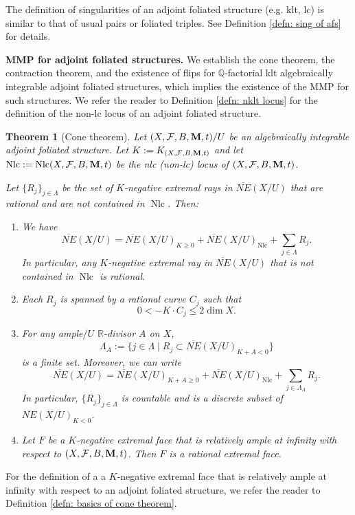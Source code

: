 \documentclass[12pt]{amsart}
\numberwithin{equation}{section}
\newcommand{\Mm}{{\bf{M}}}
\newcommand{\Qq}{\mathbb{Q}}
\newcommand{\Rr}{\mathbb{R}}
\newcommand{\Nlc}{\operatorname{Nlc}}
\newcommand{\Ff}{\mathcal{F}}
\newtheorem{thm}{Theorem}[section]
\theoremstyle{definition}
\theoremstyle{definition}
\theoremstyle{definition}
\begin{document}
The definition of singularities of an adjoint foliated structure (e.g. klt, lc) is similar to that of usual pairs or foliated triples. See Definition \ref{defn: sing of afs} for details.

\medskip

\noindent\textbf{MMP for adjoint foliated structures.} We establish the cone theorem, the contraction theorem, and the existence of flips for $\Qq$-factorial klt algebraically integrable adjoint foliated structures, which implies the existence of the MMP for such structures. 
We refer the reader to Definition \ref{defn: nklt locus} for the definition of the non-lc locus of an adjoint foliated structure.

\begin{thm}[Cone theorem]\label{thm: cone intro}
      Let $(X,\Ff,B,\Mm,t)/U$ be an algebraically integrable adjoint foliated structure. Let $K:=K_{(X,\Ff,B,\Mm,t)}$ and let $\Nlc:=\Nlc(X,\Ff,B,\Mm,t)$ be the nlc (non-lc) locus of $(X,\Ff,B,\Mm,t)$.
      
      Let $\{R_j\}_{j\in\Lambda}$ be the set of $K$-negative extremal rays in $\overline{NE}(X/U)$ that are rational and are not contained in $\Nlc$. Then:
\begin{enumerate}
    \item We have
    $$\overline{NE}(X/U)=\overline{NE}(X/U)_{K\geq 0}+\overline{NE}(X/U)_{\Nlc}+\sum_{j\in\Lambda}R_j.$$
    In particular, any $K$-negative extremal ray in $\overline{NE}(X/U)$ that is not contained in $\Nlc$ is rational.
    \item Each $R_j$ is spanned by a rational curve $C_j$ such that
    $$0<-K\cdot C_j\leq 2\dim X.$$
    \item For any ample$/U$ $\Rr$-divisor $A$ on $X$,
    $$\Lambda_A:=\{j\in\Lambda\mid R_j\subset\overline{NE}(X/U)_{K+A<0}\}$$
    is a finite set. Moreover, we can write
    $$\overline{NE}(X/U)=\overline{NE}(X/U)_{K+A\geq 0}+\overline{NE}(X/U)_{\Nlc}+\sum_{j\in\Lambda_A}R_j.$$
    In particular, $\{R_j\}_{j\in\Lambda}$ is countable and is a discrete subset of $\overline{NE}(X/U)_{K<0}$. 
    \item Let $F$ be a $K$-negative extremal face that is relatively ample at infinity with respect to $(X,\Ff,B,\Mm,t)$. 
    Then $F$ is a rational extremal face.
\end{enumerate}
\end{thm}

For the definition of a a $K$-negative extremal face that is relatively ample at infinity with respect to an adjoint foliated structure, we refer the reader to Definition \ref{defn: basics of cone theorem}.
\end{document}
